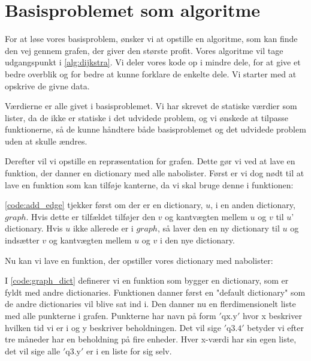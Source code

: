 \section{Basisproblemet som algoritme}
For at løse vores basisproblem, ønsker vi at opstille en algoritme, som kan finde den vej gennem grafen, der giver den største profit. Vores algoritme vil tage udgangspunkt i \autoref{alg:dijkstra}. Vi deler vores kode op i mindre dele, for at give et bedre overblik og for bedre at kunne forklare de enkelte dele. Vi starter med at opskrive de givne data. 



Værdierne er alle givet i basisproblemet. Vi har skrevet de statiske værdier som lister, da de ikke er statiske i det udvidede problem, og vi ønskede at tilpasse funktionerne, så de kunne håndtere både basisproblemet og det udvidede problem uden at skulle ændres. 

Derefter vil vi opstille en repræsentation for grafen. Dette gør vi ved at lave en funktion, der danner en dictionary med alle nabolister. Først er vi dog nødt til at lave en funktion som kan tilføje kanterne, da vi skal bruge denne i funktionen:



\autoref{code:add_edge} tjekker først om der er en dictionary, $u$, i en anden dictionary, $graph$. Hvis dette er tilfældet tilføjer den $v$ og kantvægten mellem $u$ og $v$ til  $u$' dictionary. Hvis $u$ ikke allerede er i $graph$, så laver den en ny dictionary til $u$ og indsætter $v$ og kantvægten mellem $u$ og $v$ i den nye dictionary.

Nu kan vi lave en funktion, der opstiller vores dictionary med nabolister:



I \autoref{code:graph_dict} definerer vi en funktion som bygger en dictionary, som er fyldt med andre dictionaries. Funktionen danner først en "default dictionary" som de andre dictionaries vil blive sat ind i.
Den danner nu en flerdimensionelt liste med alle punkterne i grafen. Punkterne har navn på form $'\textrm{qx.y}'$ hvor x beskriver hvilken tid vi er i og y beskriver beholdningen. Det vil sige $'\textrm{q3.4}'$ betyder vi efter tre måneder har en beholdning på fire enheder. Hver x-værdi har sin egen liste, det vil sige alle $'\textrm{q3.y}'$ er i en liste for sig selv.

